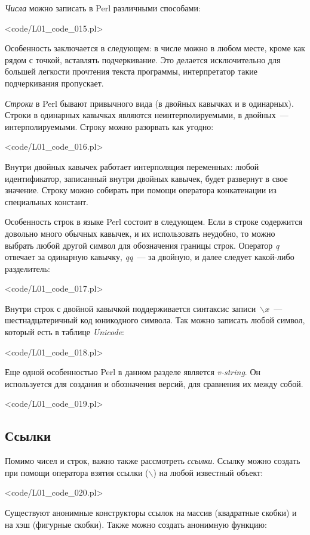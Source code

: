 \textit{Числа} можно записать в Perl различными способами:

\pr<code/L01_code_015.pl>

Особенность заключается в следующем: в числе можно в любом месте, кроме как рядом с точкой, вставлять подчеркивание.
Это делается исключительно для большей легкости прочтения текста программы, интерпретатор такие подчеркивания пропускает.

\textit{Строки} в Perl бывают привычного вида (в двойных кавычках и в одинарных).
Строки в одинарных кавычках являются неинтерполируемыми, в двойных~--- интерполируемыми.
Строку можно разорвать как угодно:

\pr<code/L01_code_016.pl>

Внутри двойных кавычек работает интерполяция переменных: любой идентификатор, записанный внутри двойных кавычек, будет развернут в свое значение.
Строку можно собирать при помощи оператора конкатенации из специальных констант.

Особенность строк в языке Perl состоит в следующем.
Если в строке содержится довольно много обычных кавычек, и их использовать неудобно, то можно выбрать любой другой символ для обозначения границы строк.
Оператор \textit{q} отвечает за одинарную кавычку, \textit{qq}~--- за двойную, и далее следует какой-либо разделитель:

\pr<code/L01_code_017.pl>

Внутри строк с двойной кавычкой поддерживается синтаксис записи~$\backslash x$~--- шестнадцатеричный код юникодного символа.
Так можно записать любой символ, который есть в таблице \textit{Unicode}:

\pr<code/L01_code_018.pl>

Еще одной особенностью Perl в данном разделе является \textit{v-string}.
Он используется для создания и обозначения версий, для сравнения их между собой.

\pr<code/L01_code_019.pl>

\subsection{Ссылки}
Помимо чисел и строк, важно также рассмотреть \textit{ссылки}.
Ссылку можно создать при помощи оператора взятия ссылки ($\backslash$) на любой известный объект:

\pr<code/L01_code_020.pl>

Существуют анонимные конструкторы ссылок на массив (квадратные скобки) и на хэш (фигурные скобки).
Также можно создать анонимную функцию:

